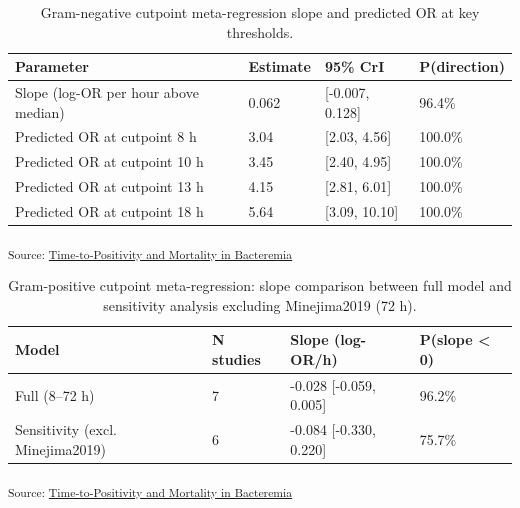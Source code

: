 \documentclass[
  11pt,
]{article}
\begin{document}
{

\begin{longtable}[]{@{}llll@{}}

\caption{\label{tbl-gneg-cutpoint}Gram-negative cutpoint meta-regression
slope and predicted OR at key thresholds.}

\tabularnewline

\toprule\noalign{}
Parameter & Estimate & 95\% CrI & P(direction) \\
\midrule\noalign{}
\endhead
\bottomrule\noalign{}
\endlastfoot
Slope (log-OR per hour above median) & 0.062 & {[}-0.007, 0.128{]} &
96.4\% \\
Predicted OR at cutpoint 8 h & 3.04 & {[}2.03, 4.56{]} & 100.0\% \\
Predicted OR at cutpoint 10 h & 3.45 & {[}2.40, 4.95{]} & 100.0\% \\
Predicted OR at cutpoint 13 h & 4.15 & {[}2.81, 6.01{]} & 100.0\% \\
Predicted OR at cutpoint 18 h & 5.64 & {[}3.09, 10.10{]} & 100.0\% \\

\end{longtable}

}

\textsubscript{Source:
\href{https://lewis-id-lab.github.io/ttp-bacteremia-meta-analysis/notebooks/mortality-analysis-preview.html\#cell-tbl-gneg-cutpoint}{Time-to-Positivity
and Mortality in Bacteremia}}

{

\begin{longtable}[]{@{}llll@{}}

\caption{\label{tbl-gpos-cutpoint}Gram-positive cutpoint
meta-regression: slope comparison between full model and sensitivity
analysis excluding Minejima2019 (72 h).}

\tabularnewline

\toprule\noalign{}
Model & N studies & Slope (log-OR/h) & P(slope \textless{} 0) \\
\midrule\noalign{}
\endhead
\bottomrule\noalign{}
\endlastfoot
Full (8--72 h) & 7 & -0.028 {[}-0.059, 0.005{]} & 96.2\% \\
Sensitivity (excl. Minejima2019) & 6 & -0.084 {[}-0.330, 0.220{]} &
75.7\% \\

\end{longtable}

}

\textsubscript{Source:
\href{https://lewis-id-lab.github.io/ttp-bacteremia-meta-analysis/notebooks/mortality-analysis-preview.html\#cell-tbl-gpos-cutpoint}{Time-to-Positivity
and Mortality in Bacteremia}}
\end{document}
